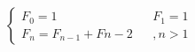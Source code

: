 \documentclass[preview]{standalone}
\begin{document}
\begin{align*}
\begin{cases}F_0 = 1 && F_1 = 1\\F_n = F_{n - 1} + F{n - 2} &&, n > 1\end{cases}
\end{align*}
\end{document}
